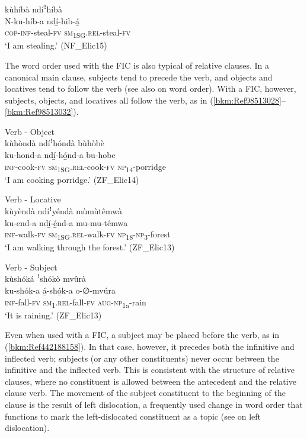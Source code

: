 \ea
\label{bkm:Ref71281611}
kùhíbà ndíꜝhíbà\\
\gll N-ku-híb-a    ndí̲-hib-á̲\\
\textsc{cop}-\textsc{inf}-steal-\textsc{fv}  \textsc{sm}\textsubscript{1SG}.\textsc{rel}-steal-\textsc{fv}\\
\glt ‘I am stealing.’ (NF\_Elic15)
\z

The word order used with the FIC is also typical of relative clauses. In a canonical main clause, subjects tend to precede the verb, and objects and locatives tend to follow the verb (see also  on word order). With a FIC, however, subjects, objects, and locatives all follow the verb, as in (\ref{bkm:Ref98513028}--\ref{bkm:Ref98513032}).

\ea
\label{bkm:Ref98513028}
Verb - Object\\
kùhòndà ndíꜝhóndà bùhòbè\\
\gll ku-hond-a  ndí̲-hó̲nd-a    bu-hobe\\
\textsc{inf}-cook-\textsc{fv}  \textsc{sm}\textsubscript{1SG}.\textsc{rel}-cook-\textsc{fv}  \textsc{np}\textsubscript{14}-porridge\\
\glt ‘I am cooking porridge.’ (ZF\_Elic14)
\z

\ea
Verb - Locative\\
kùyèndà ndíꜝyéndà mùmùtêmwà\\
\gll ku-end-a  ndí̲-é̲nd-a    mu-mu-témwa\\
\textsc{inf}-walk-\textsc{fv}  \textsc{sm}\textsubscript{1SG}.\textsc{rel}-walk-\textsc{fv}  \textsc{np}\textsubscript{18}-\textsc{np}\textsubscript{3}-forest\\
\glt ‘I am walking through the forest.’ (ZF\_Elic13)
\z

\ea
\label{bkm:Ref98513032}
Verb - Subject\\
kùshóká ꜝshókò mvûrà\\
\gll ku-shók-a  á̲-shó̲k-a    o-∅-mvúra\\
\textsc{inf}-fall-\textsc{fv}  \textsc{sm}\textsubscript{1}.\textsc{rel}-fall-\textsc{fv}  \textsc{aug}-\textsc{np}\textsubscript{1a}-rain\\
\glt ‘It is raining.’ (ZF\_Elic13)
\z

Even when used with a FIC, a subject may be placed before the verb, as in (\ref{bkm:Ref442188158}). In that case, however, it precedes both the infinitive and inflected verb; subjects (or any other constituents) never occur between the infinitive and the inflected verb. This is consistent with the structure of relative clauses, where no constituent is allowed between the antecedent and the relative clause verb. The movement of the subject constituent to the beginning of the clause is the result of left dislocation, a frequently used change in word order that functions to mark the left-dislocated constituent as a topic (see  on left dislocation).

